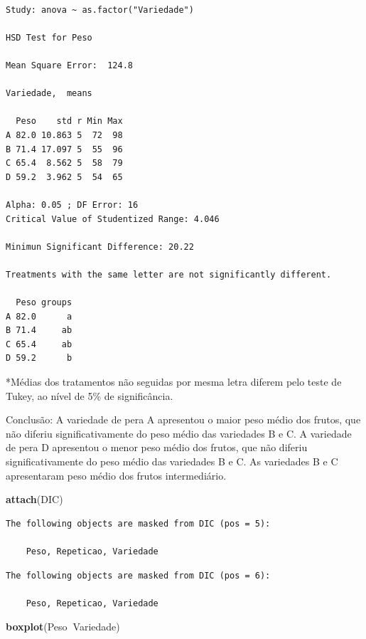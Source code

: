 \documentclass[12pt,brazil,oneside]{book}
\newenvironment{Shaded}{\begin{snugshade}}{\end{snugshade}}
\newcommand{\KeywordTok}[1]{\textcolor[rgb]{0.13,0.29,0.53}{\textbf{#1}}}
\newcommand{\NormalTok}[1]{#1}
\newcommand{\OperatorTok}[1]{\textcolor[rgb]{0.81,0.36,0.00}{\textbf{#1}}}
\begin{document}
\begin{verbatim}

Study: anova ~ as.factor("Variedade")

HSD Test for Peso 

Mean Square Error:  124.8 

Variedade,  means

  Peso    std r Min Max
A 82.0 10.863 5  72  98
B 71.4 17.097 5  55  96
C 65.4  8.562 5  58  79
D 59.2  3.962 5  54  65

Alpha: 0.05 ; DF Error: 16 
Critical Value of Studentized Range: 4.046 

Minimun Significant Difference: 20.22 

Treatments with the same letter are not significantly different.

  Peso groups
A 82.0      a
B 71.4     ab
C 65.4     ab
D 59.2      b
\end{verbatim}

*Médias dos tratamentos não seguidas por mesma letra diferem pelo teste de Tukey, ao nível de 5\% de significância.

Conclusão: A variedade de pera A apresentou o maior peso médio dos frutos, que não diferiu significativamente do peso médio das variedades B e C. A variedade de pera D apresentou o menor peso médio dos frutos, que não diferiu significativamente do peso médio das variedades B e C. As variedades B e C apresentaram peso médio dos frutos intermediário.

\begin{Shaded}
\begin{Highlighting}[]
\KeywordTok{attach}\NormalTok{(DIC)}
\end{Highlighting}
\end{Shaded}

\begin{verbatim}
The following objects are masked from DIC (pos = 5):

    Peso, Repeticao, Variedade
\end{verbatim}

\begin{verbatim}
The following objects are masked from DIC (pos = 6):

    Peso, Repeticao, Variedade
\end{verbatim}

\begin{Shaded}
\begin{Highlighting}[]
\KeywordTok{boxplot}\NormalTok{(Peso}\OperatorTok{~}\NormalTok{Variedade)}
\end{Highlighting}
\end{Shaded}
\end{document}
